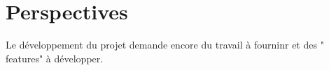 \section{Perspectives}
Le développement du projet demande encore du travail à fourninr et des " features" à développer.